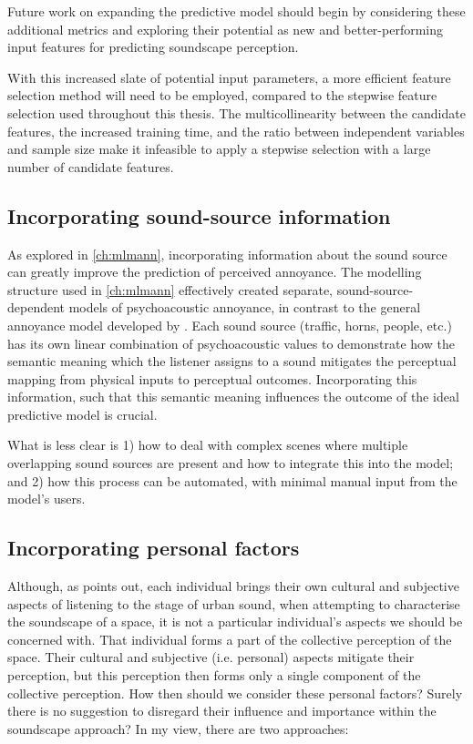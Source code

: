 Future work on expanding the predictive model should begin by considering these additional metrics and exploring their potential as new and better-performing input features for predicting soundscape perception.

With this increased slate of potential input parameters, a more efficient feature selection method will need to be employed, compared to the stepwise feature selection used throughout this thesis. The multicollinearity between the candidate features, the increased training time, and the ratio between independent variables and sample size make it infeasible to apply a stepwise selection with a large number of candidate features. 

\subsection{Incorporating sound-source information}

As explored in \cref{ch:mlmann}, incorporating information about the sound source can greatly improve the prediction of perceived annoyance. The modelling structure used in \cref{ch:mlmann} effectively created separate, sound-source-dependent models of psychoacoustic annoyance, in contrast to the general annoyance model developed by \citet{PsychoacousticsfactsmodelsZwicker}. Each sound source (traffic, horns, people, etc.) has its own linear combination of psychoacoustic values to demonstrate how the semantic meaning which the listener assigns to a sound mitigates the perceptual mapping from physical inputs to perceptual outcomes. Incorporating this information, such that this semantic meaning influences the outcome of the ideal predictive model is crucial.

What is less clear is 1) how to deal with complex scenes where multiple overlapping sound sources are present and how to integrate this into the model; and 2) how this process can be automated, with minimal manual input from the model's users. %

\subsection{Incorporating personal factors}
Although, as \citet{Droumeva2021sound} points out, each individual brings their own cultural and subjective aspects of listening to the stage of urban sound, when attempting to characterise the soundscape of a space, it is not a particular individual's aspects we should be concerned with. That individual forms a part of the collective perception of the space. Their cultural and subjective (i.e. personal) aspects mitigate their perception, but this perception then forms only a single component of the collective perception. How then should we consider these personal factors? Surely there is no suggestion to disregard their influence and importance within the soundscape approach? In my view, there are two approaches:

